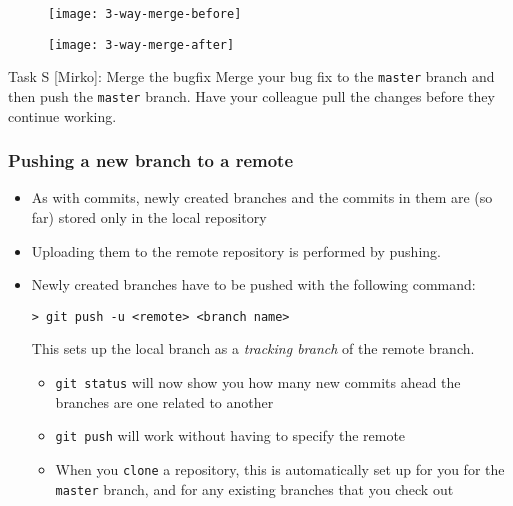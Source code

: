 \begin{frame}[fragile]

\begin{multicols}{2}
	\begin{figure}
		\texttt{[image: 3-way-merge-before]}
	\end{figure}
	\begin{figure}
		\texttt{[image: 3-way-merge-after]}
	\end{figure}
\end{multicols}

	\begin{block}{Task S [Mirko]: Merge the bugfix}
	Merge your bug fix to the \texttt{master} branch and then push the \texttt{master} branch. Have your colleague pull the changes before they continue working.
	\end{block}
\end{frame}


\begin{frame}[fragile]

\frametitle{Pushing a new branch to a remote}

	\begin{itemize}
	\item As with commits, newly created branches and the commits in them are (so far) stored only in the local repository
	\item  Uploading them to the remote repository is performed by pushing. 
	\item Newly created branches have to be pushed with the following command:
\begin{verbatim}
> git push -u <remote> <branch name>
\end{verbatim}
	This sets up the local branch as a \textit{tracking branch} of the remote branch.
	\begin{itemize}
	\item \texttt{git status} will now show you how many new commits ahead the branches are one related to another
	\item \texttt{git push} will work without having to specify the remote
	\item When you \texttt{clone} a repository, this is automatically set up for you for the \texttt{master} branch, and for any existing branches that you check out
	\end{itemize}
	\end{itemize}
\end{frame}

